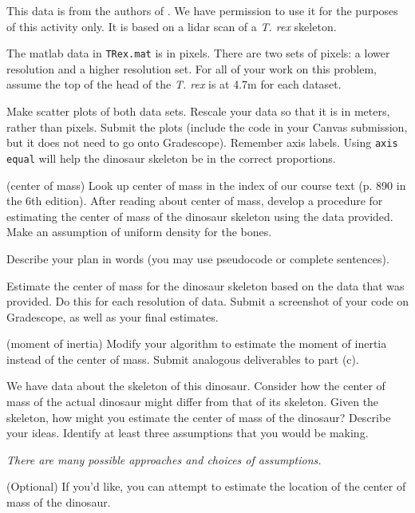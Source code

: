 \documentclass[12pt,letterpaper,noanswers]{exam}
\begin{document}
\begin{questions}
This data is from the authors of \cite{hutchinson2011computational}.  We have permission to use it for the purposes of this activity only.  It is based on a lidar scan of a \emph{T. rex} skeleton.

The matlab data in \texttt{TRex.mat} is in pixels.  There are two sets of pixels: a lower resolution and a higher resolution set.  For all of your work on this problem, assume the top of the head of the \emph{T. rex} is at 4.7m for each dataset.
\begin{parts}
\item Make scatter plots of both data sets.  Rescale your data so that it is in meters, rather than pixels.  Submit the plots (include the code in your Canvas submission, but it does not need to go onto Gradescope).  Remember axis labels.  Using \texttt{axis equal} will help the dinosaur skeleton be in the correct proportions.
\item (center of mass) Look up center of mass in the index of our course text (p. 890 in the 6th edition).  After reading about center of mass, develop a procedure for estimating the center of mass of the dinosaur skeleton using the data provided.  Make an assumption of uniform density for the bones.

Describe your plan in words (you may use pseudocode or complete sentences).
\item Estimate the center of mass for the dinosaur skeleton based on the data that was provided.  Do this for each resolution of data.  Submit a screenshot of your code on Gradescope, as well as your final estimates.
\item (moment of inertia) Modify your algorithm to estimate the moment of inertia instead of the center of mass.  Submit analogous deliverables to part (c).
\item We have data about the skeleton of this dinosaur.  Consider how the center of mass of the actual dinosaur might differ from that of its skeleton.  Given the skeleton, how might you estimate the center of mass of the dinosaur?  Describe your ideas.  Identify at least three assumptions that you would be making.

\emph{There are many possible approaches and choices of assumptions.}

\item (Optional) If you'd like, you can attempt to estimate the location of the center of mass of the dinosaur.
\end{parts}

\end{questions}



\end{document}

